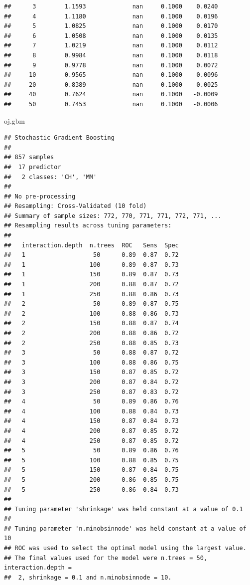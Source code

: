 \documentclass[
]{book}
\newenvironment{Shaded}{\begin{snugshade}}{\end{snugshade}}
\newcommand{\NormalTok}[1]{#1}
\begin{document}
\begin{verbatim}
##      3        1.1593             nan     0.1000    0.0240
##      4        1.1180             nan     0.1000    0.0196
##      5        1.0825             nan     0.1000    0.0170
##      6        1.0508             nan     0.1000    0.0135
##      7        1.0219             nan     0.1000    0.0112
##      8        0.9984             nan     0.1000    0.0118
##      9        0.9778             nan     0.1000    0.0072
##     10        0.9565             nan     0.1000    0.0096
##     20        0.8389             nan     0.1000    0.0025
##     40        0.7624             nan     0.1000   -0.0009
##     50        0.7453             nan     0.1000   -0.0006
\end{verbatim}

\begin{Shaded}
\begin{Highlighting}[]
\NormalTok{oj.gbm}
\end{Highlighting}
\end{Shaded}

\begin{verbatim}
## Stochastic Gradient Boosting 
## 
## 857 samples
##  17 predictor
##   2 classes: 'CH', 'MM' 
## 
## No pre-processing
## Resampling: Cross-Validated (10 fold) 
## Summary of sample sizes: 772, 770, 771, 771, 772, 771, ... 
## Resampling results across tuning parameters:
## 
##   interaction.depth  n.trees  ROC   Sens  Spec
##   1                   50      0.89  0.87  0.72
##   1                  100      0.89  0.87  0.73
##   1                  150      0.89  0.87  0.73
##   1                  200      0.88  0.87  0.72
##   1                  250      0.88  0.86  0.73
##   2                   50      0.89  0.87  0.75
##   2                  100      0.88  0.86  0.73
##   2                  150      0.88  0.87  0.74
##   2                  200      0.88  0.86  0.72
##   2                  250      0.88  0.85  0.73
##   3                   50      0.88  0.87  0.72
##   3                  100      0.88  0.86  0.75
##   3                  150      0.87  0.85  0.72
##   3                  200      0.87  0.84  0.72
##   3                  250      0.87  0.83  0.72
##   4                   50      0.89  0.86  0.76
##   4                  100      0.88  0.84  0.73
##   4                  150      0.87  0.84  0.73
##   4                  200      0.87  0.85  0.72
##   4                  250      0.87  0.85  0.72
##   5                   50      0.89  0.86  0.76
##   5                  100      0.88  0.85  0.75
##   5                  150      0.87  0.84  0.75
##   5                  200      0.86  0.85  0.75
##   5                  250      0.86  0.84  0.73
## 
## Tuning parameter 'shrinkage' was held constant at a value of 0.1
## 
## Tuning parameter 'n.minobsinnode' was held constant at a value of 10
## ROC was used to select the optimal model using the largest value.
## The final values used for the model were n.trees = 50, interaction.depth =
##  2, shrinkage = 0.1 and n.minobsinnode = 10.
\end{verbatim}
\end{document}
